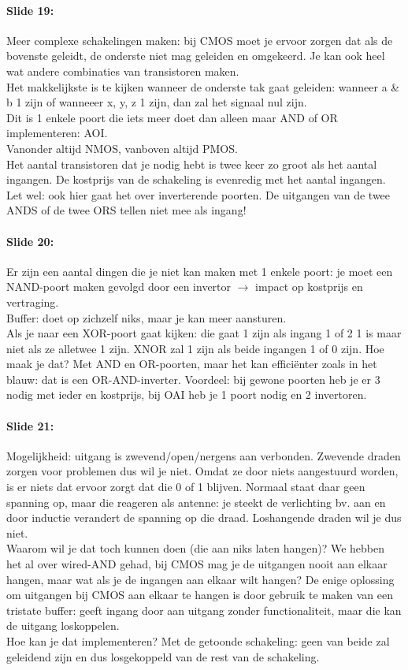 \documentclass[10pt,a4paper]{book}
\begin{document}
\paragraph{Slide 19:} Meer complexe schakelingen maken: bij CMOS moet je ervoor zorgen dat als de bovenste geleidt, de onderste niet mag geleiden en omgekeerd. Je kan ook heel wat andere combinaties van transistoren maken.\\
Het makkelijkste is te kijken wanneer de onderste tak gaat geleiden: wanneer a \& b 1 zijn of wanneeer x, y, z 1 zijn, dan zal het signaal nul zijn.\\
Dit is 1 enkele poort die iets meer doet dan alleen maar AND of OR implementeren: AOI. \\
Vanonder altijd NMOS, vanboven altijd PMOS. \\
Het aantal transistoren dat je nodig hebt is twee keer zo groot als het aantal ingangen. De kostprijs van de schakeling is evenredig met het aantal ingangen. Let wel: ook hier gaat het over inverterende poorten. De uitgangen van de twee ANDS of de twee ORS tellen niet mee als ingang! 

\paragraph{Slide 20:} Er zijn een aantal dingen die je niet kan maken met 1 enkele poort: je moet een NAND-poort maken gevolgd door een invertor $\rightarrow$ impact op kostprijs en vertraging.\\
Buffer: doet op zichzelf niks, maar je kan meer aansturen.\\
Als je naar een XOR-poort gaat kijken: die gaat 1 zijn als ingang 1 of 2 1 is maar niet als ze alletwee 1 zijn. XNOR zal 1 zijn als beide ingangen 1 of 0 zijn. Hoe maak je dat? Met AND en OR-poorten, maar het kan effici\"enter zoals in het blauw: dat is een OR-AND-inverter. Voordeel: bij gewone poorten heb je er 3 nodig met ieder en kostprijs, bij OAI heb je 1 poort nodig en 2 invertoren.

\paragraph{Slide 21:} Mogelijkheid: uitgang is zwevend/open/nergens aan verbonden. Zwevende draden zorgen voor problemen dus wil je niet. Omdat ze door niets aangestuurd worden, is er niets dat ervoor zorgt dat die 0 of 1 blijven. Normaal staat daar geen spanning op, maar die reageren als antenne: je steekt de verlichting bv. aan en door inductie verandert de spanning op die draad. Loshangende draden wil je dus niet. \\
Waarom wil je dat toch kunnen doen (die aan niks laten hangen)? We hebben het al over wired-AND gehad, bij CMOS mag je de uitgangen nooit aan elkaar hangen, maar wat als je de ingangen aan elkaar wilt hangen? De enige oplossing om uitgangen bij CMOS aan elkaar te hangen is door gebruik te maken van een tristate buffer: geeft ingang door aan uitgang zonder functionaliteit, maar die kan de uitgang loskoppelen.\\
Hoe kan je dat implementeren? Met de getoonde schakeling: geen van beide zal geleidend zijn en dus losgekoppeld van de rest van de schakeling.
\end{document}
